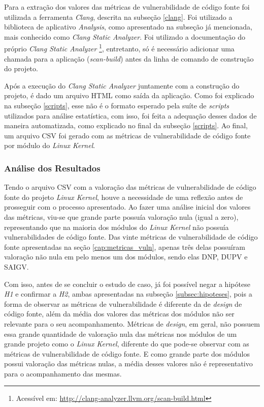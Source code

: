 Para a extração dos valores das métricas de vulnerabilidade de código fonte foi
utilizada a ferramenta \emph{Clang}, descrita na subseção
\ref{clang}. Foi utilizado a biblioteca de aplicativo
\textit{Analysis}, como apresentado na subseção já mencionada, mais conhecido como \emph{Clang Static
Analyzer}. Foi utilizado a documentação do próprio \emph{Clang Static Analyzer}
\footnote{Acessível em: \url{http://clang-analyzer.llvm.org/scan-build.html}},
entretanto, só é necessário adicionar uma chamada para a aplicação
(\textit{scan-build}) antes da linha de comando de construção do projeto.

Após a execução do \emph{Clang Static Analyzer} juntamente com a construção do
projeto, é dado um arquivo HTML como saída da aplicação. Como foi explicado na
subseção \ref{scripts}, esse não é o formato esperado pela suíte de
\textit{scripts} utilizados para análise estatística, com isso, foi feita a
adequação desses dados de maneira automatizada, como explicado no final da
subseção \ref{scripts}. Ao final, um arquivo CSV foi gerado com as métricas de
vulnerabilidade de código fonte por módulo do \emph{Linux Kernel}.

\subsubsection{Análise dos Resultados}

Tendo o arquivo CSV com a valoração das métricas de vulnerabilidade de código
fonte do projeto \emph{Linux Kernel}, houve a necessidade de uma reflexão antes
de prosseguir com o processo apresentado. Ao
fazer uma análise inicial dos valores das métricas, viu-se que grande parte
possuía valoração nula (igual a zero), representando que na maioria dos módulos
do \emph{Linux Kernel} não possuía vulnerabilidades de código fonte. Das vinte
métricas de vulnerabilidade de código fonte apresentadas na seção
\ref{cap:metricas_vuln}, apenas três delas possuíram valoração não nula em pelo
menos um dos módulos, sendo elas DNP, DUPV e SAIGV. 

Com isso, antes de se concluir o estudo de caso, já foi
possível negar a hipótese \emph{H1} e confirmar a \emph{H2}, ambas apresentadas na subseção
\ref{subsec:hipoteses}, pois a forma de observar as métricas de vulnerabilidade
é diferente da de \textit{design} de código fonte, além da média dos valores
das métricas dos módulos não ser relevante para o seu acompanhamento. Métricas de \textit{design},
em geral, não possuem essa grande quantidade de valoração nula das métricas nos
módulos de um grande projeto como o \emph{Linux Kernel}, diferente do que
pode-se observar com as métricas de vulnerabilidade de código fonte. E como
grande parte dos módulos possui valoração das métricas nulas, a média desses
valores não é representativo para o acompanhamento das mesmas.

